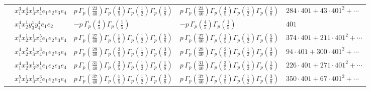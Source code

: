 \documentclass[11pt]{article}
\begin{document}
\begin{table}[ht]
{\begin{tabular}{@{}lllll@{}}
 & $x_{1}^{3} x_{2}^{4} x_{3}^{1} x_{4}^{1}  e_{1} e_{2} e_{3} e_{4}$ & $p \, \Gamma_p \left( \frac{23}{40} \right) \Gamma_p \left( \frac{4}{5} \right) \Gamma_p \left( \frac{1}{2} \right) \Gamma_p \left( \frac{1}{8} \right)$ & $p \, \Gamma_p \left( \frac{23}{40} \right) \Gamma_p \left( \frac{4}{5} \right) \Gamma_p \left( \frac{1}{2} \right) \Gamma_p \left( \frac{1}{8} \right)$ & $284{\cdot}401{+}43{\cdot}401^{2}{+}\cdots$ \\
 & $x_{1}^{4} x_{2}^{1} y_{3}^{1} y_{4}^{4} e_{1} e_{2}$ & $- p \, \Gamma_p \left( \frac{4}{5} \right) \Gamma_p \left( \frac{1}{5} \right)$ & $- p \, \Gamma_p \left( \frac{4}{5} \right) \Gamma_p \left( \frac{1}{5} \right)$ & $401$ \\
 & $x_{1}^{4} x_{2}^{1} x_{3}^{1} x_{4}^{5}  e_{1} e_{2} e_{3} e_{4}$ & $p \, \Gamma_p \left( \frac{27}{40} \right) \Gamma_p \left( \frac{1}{5} \right) \Gamma_p \left( \frac{1}{2} \right) \Gamma_p \left( \frac{5}{8} \right)$ & $p \, \Gamma_p \left( \frac{27}{40} \right) \Gamma_p \left( \frac{1}{5} \right) \Gamma_p \left( \frac{1}{2} \right) \Gamma_p \left( \frac{5}{8} \right)$ & $374{\cdot}401{+}211{\cdot}401^{2}{+}\cdots$ \\
 & $x_{1}^{4} x_{2}^{2} x_{3}^{1} x_{4}^{3}  e_{1} e_{2} e_{3} e_{4}$ & $p \, \Gamma_p \left( \frac{29}{40} \right) \Gamma_p \left( \frac{2}{5} \right) \Gamma_p \left( \frac{1}{2} \right) \Gamma_p \left( \frac{3}{8} \right)$ & $p \, \Gamma_p \left( \frac{29}{40} \right) \Gamma_p \left( \frac{2}{5} \right) \Gamma_p \left( \frac{1}{2} \right) \Gamma_p \left( \frac{3}{8} \right)$ & $94{\cdot}401{+}300{\cdot}401^{2}{+}\cdots$ \\
 & $x_{1}^{4} x_{2}^{3} x_{3}^{1} x_{4}^{1}  e_{1} e_{2} e_{3} e_{4}$ & $p \, \Gamma_p \left( \frac{31}{40} \right) \Gamma_p \left( \frac{3}{5} \right) \Gamma_p \left( \frac{1}{2} \right) \Gamma_p \left( \frac{1}{8} \right)$ & $p \, \Gamma_p \left( \frac{31}{40} \right) \Gamma_p \left( \frac{3}{5} \right) \Gamma_p \left( \frac{1}{2} \right) \Gamma_p \left( \frac{1}{8} \right)$ & $226{\cdot}401{+}271{\cdot}401^{2}{+}\cdots$ \\
 & $x_{1}^{5} x_{2}^{1} x_{3}^{1} x_{4}^{3}  e_{1} e_{2} e_{3} e_{4}$ & $p \, \Gamma_p \left( \frac{37}{40} \right) \Gamma_p \left( \frac{1}{5} \right) \Gamma_p \left( \frac{1}{2} \right) \Gamma_p \left( \frac{3}{8} \right)$ & $p \, \Gamma_p \left( \frac{37}{40} \right) \Gamma_p \left( \frac{1}{5} \right) \Gamma_p \left( \frac{1}{2} \right) \Gamma_p \left( \frac{3}{8} \right)$ & $350{\cdot}401{+}67{\cdot}401^{2}{+}\cdots$ \\

\end{tabular}}
\end{table}
\end{document}

